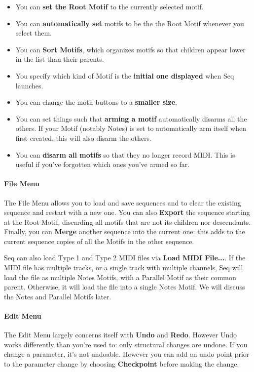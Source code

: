\documentclass[twoside,10pt]{article}
\begin{document}
	\begin{itemize}
	\item You can {\bf set the Root Motif} to the currently selected motif.  
	\item You can {\bf automatically set} motifs to be the the Root Motif whenever you select them.  
	\item You can {\bf Sort Motifs}, which organizes motifs so that children appear lower in the list than their parents.  
	\item You specify which kind of Motif is the {\bf initial one displayed} when Seq launches.
	\item You can change the motif buttons to a {\bf smaller size}.
	\item You can set things such that {\bf arming a motif} automatically disarms all the others.  If your Motif (notably Notes) is set to automatically arm itself when first created, this will also disarm the others.
	\item You can {\bf disarm all motifs} so that they no longer record MIDI.  This is useful if you've forgotten which ones you've armed so far.
	\end{itemize}

\paragraph{File Menu}
The File Menu allows you to load and save sequences and to clear the existing sequence and restart with a new one.  You can also {\bf Export} the sequence starting at the Root Motif, discarding all motifs that are not its children nor descendants.  Finally, you can {\bf Merge} another sequence into the current one: this adds to the current sequence copies of all the Motifs in the other sequence.

Seq can also load Type 1 and Type 2 MIDI files via {\bf Load MIDI File...}.  If the MIDI file has multiple tracks, or a single track with multiple channels, Seq will load the file as multiple Notes Motifs, with a Parallel Motif as their common parent. Otherwise, it will load the file into a single Notes Motif.  We will discuss the Notes and Parallel Motifs later.

\paragraph{Edit Menu}
The Edit Menu largely concerns itself with {\bf Undo} and {\bf Redo}.  However Undo works differently than you're used to: only structural changes are undone.  If you change a parameter, it's not undoable.  However you can add an undo point prior to the parameter change by choosing {\bf Checkpoint} before making the change.
\end{document}
